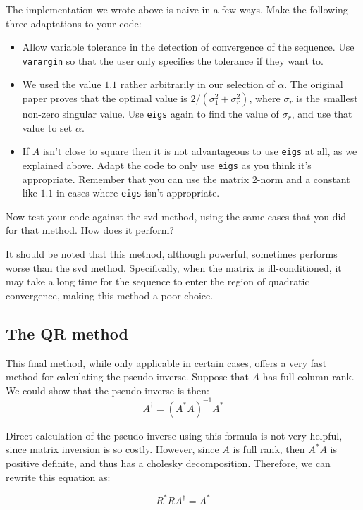 \begin{problem}
The implementation we wrote above is naive in a few ways. Make the following three adaptations to your code:
\begin{itemize}
\item Allow variable tolerance in the detection of convergence of the sequence. Use {\tt varargin} so that the user only specifies the tolerance if they want to.
\item We used the value $1.1$ rather arbitrarily in our selection of $\alpha$. The original paper proves that the optimal value is $2/(\sigma_1^2 + \sigma_r^2)$, where $\sigma_r$ is the smallest non-zero singular value. Use {\tt eigs} again to find the value of $\sigma_r$, and use that value to set $\alpha$.
\item If $A$ isn't close to square then it is not advantageous to use {\tt eigs} at all, as we explained above. Adapt the code to only use {\tt eigs} as you think it's appropriate. Remember that you can use the matrix $2$-norm and a constant like $1.1$ in cases where {\tt eigs} isn't appropriate.
\end{itemize}

Now test your code against the svd method, using the same cases that you did for that method. How does it perform?
\end{problem}

It should be noted that this method, although powerful, sometimes performs worse than the svd method. Specifically, when the matrix is ill-conditioned, it may take a long time for the sequence to enter the region of quadratic convergence, making this method a poor choice.

\subsection*{The QR method}

This final method, while only applicable in certain cases, offers a very fast method for calculating the pseudo-inverse. Suppose that $A$ has full column rank. We could show that the pseudo-inverse is then:
\[
A^\dagger = (A^* A)^{-1} A^*
\]

Direct calculation of the pseudo-inverse using this formula is not very helpful, since matrix inversion is so costly. However, since $A$ is full rank, then $A^*A$ is positive definite, and thus has a cholesky decomposition. Therefore, we can rewrite this equation as:

\[
R^*R A^\dagger = A^*
\]

